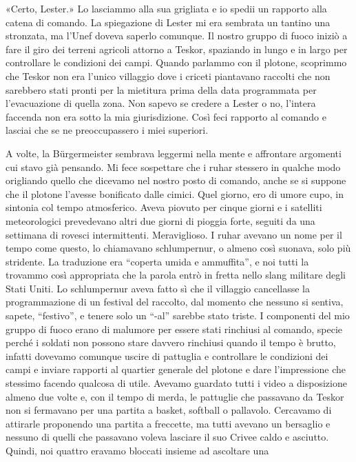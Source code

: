 «Certo, Lester.» Lo lasciammo alla sua grigliata e io spedii un rapporto
alla catena di comando. La spiegazione di Lester mi era sembrata un
tantino una stronzata, ma l'Unef doveva saperlo comunque. Il nostro
gruppo di fuoco iniziò a fare il giro dei terreni agricoli attorno a
Teskor, spaziando in lungo e in largo per controllare le condizioni dei
campi. Quando parlammo con il plotone, scoprimmo che Teskor non era
l'unico villaggio dove i criceti piantavano raccolti che non sarebbero
stati pronti per la mietitura prima della data programmata per
l'evacuazione di quella zona. Non sapevo se credere a Lester o no,
l'intera faccenda non era sotto la mia giurisdizione. Così feci rapporto
al comando e lasciai che se ne preoccupassero i miei superiori.

\hfill\break

A volte, la Bürgermeister sembrava leggermi nella mente e affrontare
argomenti cui stavo già pensando. Mi fece sospettare che i ruhar
stessero in qualche modo origliando quello che dicevamo nel nostro posto
di comando, anche se si suppone che il plotone l'avesse bonificato dalle
cimici. Quel giorno, ero di umore cupo, in sintonia col tempo
atmosferico. Aveva piovuto per cinque giorni e i satelliti meteorologici
prevedevano altri due giorni di pioggia forte, seguiti da una settimana
di rovesci intermittenti. Meraviglioso. I ruhar avevano un nome per il
tempo come questo, lo chiamavano schlumpernur, o almeno così suonava,
solo più stridente. La traduzione era ``coperta umida e ammuffita'', e
noi tutti la trovammo così appropriata che la parola entrò in fretta
nello slang militare degli Stati Uniti. Lo schlumpernur aveva fatto sì
che il villaggio cancellasse la programmazione di un festival del
raccolto, dal momento che nessuno si sentiva, sapete, ``festivo'', e
tenere solo un ``-al'' sarebbe stato triste. I componenti del mio gruppo
di fuoco erano di malumore per essere stati rinchiusi al comando, specie
perché i soldati non possono stare davvero rinchiusi quando il tempo è
brutto, infatti dovevamo comunque uscire di pattuglia e controllare le
condizioni dei campi e inviare rapporti al quartier generale del plotone
e dare l'impressione che stessimo facendo qualcosa di utile. Avevamo
guardato tutti i video a disposizione almeno due volte e, con il tempo
di merda, le pattuglie che passavano da Teskor non si fermavano per una
partita a basket, softball o pallavolo. Cercavamo di attirarle
proponendo una partita a freccette, ma tutti avevano un bersaglio e
nessuno di quelli che passavano voleva lasciare il suo Crivee caldo e
asciutto. Quindi, noi quattro eravamo bloccati insieme ad ascoltare una
